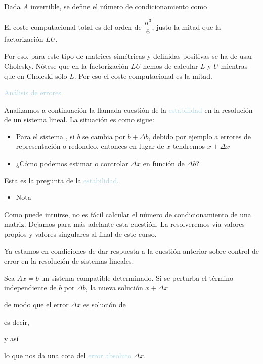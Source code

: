 \documentclass[12pt]{article}
\begin{document}
Dada $A$ invertible, se define el número de condicionamiento como \begin{center}
\end{center}
El coste computacional total es del orden de $\dfrac{n^3}{6}$, justo la mitad que la factorización $LU$.

Por eso, para este tipo de matrices simétricas y definidas positivas se ha de usar Cholesky. Nótese que en la factorización $LU$ hemos de calcular $L$ y $U$ mientras que en Choleski sólo $L$. Por eso el coste computacional es la mitad.

\textcolor{lightblue}{\underline{Análisis de errores}}

Analizamos a continuación la llamada cuestión de la \textcolor{lightblue}{estabilidad} en la resolución de un sistema lineal. La situación es como sigue:
\begin{itemize}
\item Para el sistema , si $b$ se cambia por $b+\Delta b$, debido por ejemplo a errores de representación o redondeo, entonces en lugar de $x$ tendremos $x+\Delta x$
\end{itemize}
\begin{itemize}[label=\color{red}\textbullet, leftmargin=*]
    \item \color{lightblue} ¿Cómo podemos estimar o controlar $\Delta x$ en función de $\Delta b$?
\end{itemize}
Esta es la pregunta de la \textcolor{lightblue}{estabilidad}.
\begin{itemize}[label=\color{red}\textbullet, leftmargin=*]
    \item \color{lightblue}Nota
\end{itemize}
Como puede intuirse, no es fácil calcular el número de condicionamiento de una matriz. Dejamos para más adelante esta cuestión. La resolveremos vía valores propios y valores singulares al final de este curso.

Ya estamos en condiciones de dar respuesta a la cuestión anterior sobre control de error en la resolución de sistemas lineales.

Sea $Ax=b$ un sistema compatible determinado. Si se perturba el término independiente de $b$ por $\Delta b$, la nueva solución $x+\Delta x$\begin{center}
\end{center} de modo que el error $\Delta x$ es solución de \begin{center}
 \end{center}es decir, \begin{center}
 \end{center}y así \begin{center}
\end{center} lo que nos da una cota del \textcolor{lightblue}{error absoluto} $\Delta x$.
\end{document}
